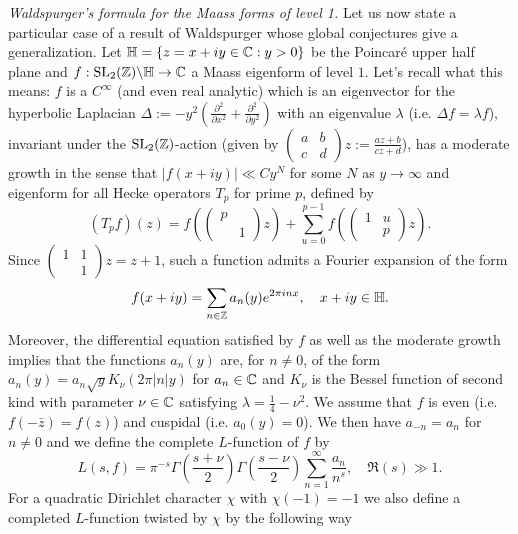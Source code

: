 \emph{Waldspurger's formula for the Maass forms of level 1.}
Let us now state a particular case of a result of Waldspurger \cite{waldspurger1985valeurs} whose global conjectures give a generalization.
Let $\mathbb{H} = \{z = x + iy \in \mathbb{C}: y > 0\}$ be the Poincaré upper half plane and $f: \mathrm{SL}_2(\mathbb{Z}) \backslash \mathbb{H} \to \mathbb{C}$ a Maass eigenform of level $1$.
Let's recall what this means: $f$ is a $C^\infty$ (and even real analytic) which is an eigenvector for the hyperbolic Laplacian $\Delta := -y^2 \left(\frac{\partial^2}{\partial x^2} + \frac{\partial^2}{\partial y^2}\right)$ with an eigenvalue $\lambda$ (i.e. $\Delta f = \lambda f$), invariant under the $\mathrm{SL}_2(\mathbb{Z})$-action (given by $\left(\begin{smallmatrix} a & b \\ c & d \end{smallmatrix}\right) z := \frac{az + b}{cz + d}$), has a moderate growth in the sense that $|f(x + iy)| \ll Cy^N$ for some $N$ as $y \to \infty$ and eigenform for all Hecke operators $T_p$ for prime $p$, defined by
\[
    (T_p f)(z) = f\left(\left(\begin{smallmatrix}
        p&\\&1
    \end{smallmatrix}\right)z\right) + \sum_{u=0}^{p-1} f\left(\left(\begin{smallmatrix}
        1&u\\&p
    \end{smallmatrix}\right)z\right).
\]
Since $\left(\begin{smallmatrix}
    1&1\\&1
\end{smallmatrix}\right)z = z + 1$, such a function admits a Fourier expansion of the form
\[
    f(x + iy) = \sum_{n \in \mathbb{Z}} a_n(y) e^{2\pi i n x}, \quad x + iy \in \mathbb{H}.
\]
Moreover, the differential equation satisfied by $f$ as well as the moderate growth implies that the functions $a_n(y)$ are, for $n \neq 0$, of the form $a_n(y) = a_n \sqrt{y} K_\nu(2 \pi |n| y)$ for $a_n \in \mathbb{C}$ and $K_\nu$ is the Bessel function of second kind with parameter $\nu \in \mathbb{C}$ satisfying $\lambda = \frac{1}{4} - \nu^2$.
We assume that $f$ is even (i.e. $f(-\bar{z}) = f(z)$) and cuspidal (i.e. $a_0(y) = 0$).
We then have $a_{-n} = a_n$ for $n\neq 0$ and we define the complete $L$-function of $f$ by
\[
    L(s, f) = \pi^{-s} \Gamma\left(\frac{s + \nu}{2}\right) \Gamma\left(\frac{s - \nu}{2}\right) \sum_{n=1}^{\infty} \frac{a_n}{n^s}, \quad \Re(s) \gg 1.
\]
For a quadratic Dirichlet character $\chi$ with $\chi(-1) = -1$ we also define a completed $L$-function twisted by $\chi$ by the following way
